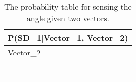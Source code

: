 \begin{table}[H]
\centering
\begin{tabular}{|l|l|l|l|l|l|l|l|l|l|}
\hline
\multicolumn{10}{|l|}{P(SD\_1|Vector\_1, Vector\_2)} \\\hline 
Vector\_2 & \multicolumn{3}{l|}{} & \multicolumn{3}{l|}{} &
\multicolumn{3}{l|}{}\\\hline 
 &       &       &       &       &       &       &       &       &       \\
\hline &       &       &       &       &       &       &       &       &       \\ \hline
 &       &       &       &       &       &       &       &       &       \\ \hline
 &       &       &       &       &       &       &       &       &       \\ \hline
 &       &       &       &       &       &       &       &       &       \\ \hline
 &       &       &       &       &       &       &       &       &       \\ \hline
\end{tabular}
\caption{The probability table for sensing the angle given two vectors.}
\label{SDtable2}
\end{table}


